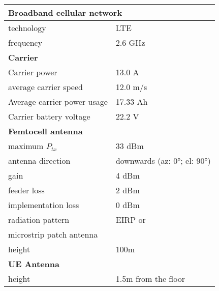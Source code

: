 \begin{table}[!htb]
\centering
\begin{tabular}[t]{ll}
        \toprule
        \multicolumn{2}{l}{\textbf{Broadband cellular network}} \\
        \hline
        \hspace{3mm}  technology        & LTE     \\
        \hspace{3mm}  frequency         & 2.6 GHz \\
        \hline
        \multicolumn{2}{l}{\textbf{Carrier}} \\
        \hline  
        \hspace{3mm}  Carrier power        & 13.0 A   \\
        \hspace{3mm}  average carrier speed        & 12.0 m/s \\
        \hspace{3mm}  Average carrier power usage      & 17.33 Ah    \\
        \hspace{3mm}  Carrier battery voltage       & 22.2 V \\
        \hline
        \multicolumn{2}{l}{\textbf{Femtocell antenna}} \\
        \hline  
        \hspace{3mm}  maximum $P_{tx}$          & 33 dBm   \\
        \hspace{3mm}  antenna  direction        & downwards (az: \ang{0}; el: \ang{90})    \\ 
        \hspace{3mm}  gain                      & 4 dBm   \\ 
        \hspace{3mm}  feeder loss               & 2 dBm   \\ 
        \hspace{3mm}  implementation loss       & 0 dBm   \\
        \hspace{3mm}  radiation pattern         & \acs{EIRP} or \\ microstrip patch antenna\\
        \hspace{3mm}  height                    & 100m  \\
        \hline
        \multicolumn{2}{l}{\textbf{\acs{UE} Antenna}} \\
        \hline 
        \hspace{3mm} height                     & 1.5m from the floor       \\ 

\end{tabular}
\end{table}
